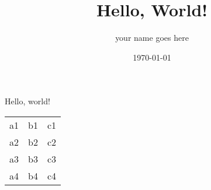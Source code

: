 \documentclass[11pt]{article}
\title{Hello, World!}
\author{your name goes here}
\date{\today}
\begin{document}
    \maketitle

    Hello, world!

    \begin{center} %
        
        \begin{tabular}{|l|l||r|}
            \hline
            a1 & b1 & c1 \\
            a2 & b2 & c2 \\
            a3 & b3 & c3 \\
            \hline
            a4 & b4 & c4 \\
            \hline
        \end{tabular}

    \end{center}
\end{document}
